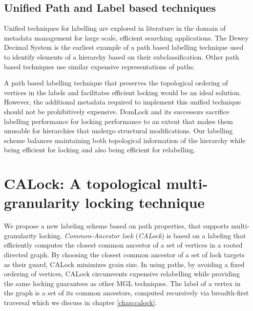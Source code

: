 \subsection{Unified Path and Label based techniques}
Unified techniques for labelling are explored in literature in the domain of metadata management for large scale, efficient searching applications. The Dewey Decimal System \cite{DBLP:journals/jd/Sweeney83} is the earliest example of a path based labelling technique used to identify elements of a hierarchy based on their subclassification. Other path based techniques use similar expensive representations of paths. 

A path based labelling technique that preserves the topological ordering of vertices in the labels and facilitates efficient locking would be an ideal solution. However, the additional metadata required to implement this unified technique should not be prohibitively expensive. DomLock and its successors sacrifice labelling performance for locking performance to an extent that makes them unusable for hierarchies that undergo structural modifications. Our labelling scheme balances maintaining both topological information of the hierarchy while being efficient for locking and also being efficient for relabelling. 

\section{CALock: A topological multi-granularity locking technique}

We propose a new labeling scheme based on path properties, that supports multi-granularity locking. {\em Common-Ancestor lock} ({\em CALock}) is based on a labeling that efficiently computes the closest common ancestor of a set of vertices in a rooted directed graph.
By choosing the closest common ancestor of a set of lock targets as their guard, CALock minimizes grain size. In using paths, by avoiding a fixed ordering of vertices, CALock circumvents expensive relabelling while providing the same locking guarantees as other MGL techniques. The label of a vertex in the graph is a set of its common ancestors, computed recursively via breadth-first traversal which we discuss in chapter \ref{chap:calock}.